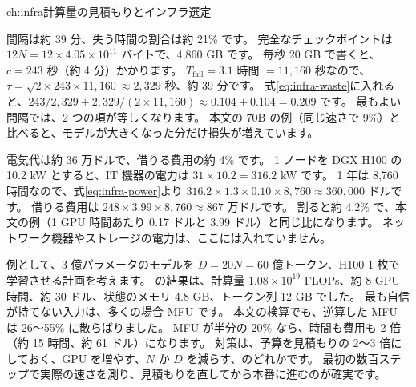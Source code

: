 \begin{answers}{ch:infra}{計算量の見積もりとインフラ選定}
\item 間隔は約 39 分、失う時間の割合は約 21\% です。
完全なチェックポイントは $12N=12\times4.05\times10^{11}$ バイトで、4,860 GB です。
毎秒 20 GB で書くと、$c=243$ 秒（約 4 分）かかります。
$T_{\mathrm{fail}}=3.1$ 時間 $=11{,}160$ 秒なので、$\tau=\sqrt{2\times243\times11{,}160}\approx2{,}329$ 秒、約 39 分です。
式\eqref{eq:infra-waste}に入れると、$243/2{,}329+2{,}329/(2\times11{,}160)\approx0.104+0.104=0.209$ です。
最もよい間隔では、2 つの項が等しくなります。
本文の 70B の例（同じ速さで 9\%）と比べると、モデルが大きくなった分だけ損失が増えています。
\item 電気代は約 36 万ドルで、借りる費用の約 4\% です。
1 ノードを DGX H100 の 10.2 kW とすると、IT 機器の電力は $31\times10.2=316.2$ kW です。
1 年は 8,760 時間なので、式\eqref{eq:infra-power}より $316.2\times1.3\times0.10\times8{,}760\approx360{,}000$ ドルです。
借りる費用は $248\times3.99\times8{,}760\approx867$ 万ドルです。
割ると約 4.2\% で、本文の例（1 GPU 時間あたり 0.17 ドルと 3.99 ドル）と同じ比になります。
ネットワーク機器やストレージの電力は、ここには入れていません。
\item 例として、3 億パラメータのモデルを $D=20N=60$ 億トークン、H100 1 枚で学習させる計画を考えます。
 の結果は、計算量 $1.08\times10^{19}$ FLOPs、約 8 GPU 時間、約 30 ドル、状態のメモリ 4.8 GB、トークン列 12 GB でした。
最も自信が持てない入力は、多くの場合 MFU です。
本文の検算でも、逆算した MFU は 26〜55\% に散らばりました。
MFU が半分の 20\% なら、時間も費用も 2 倍（約 15 時間、約 61 ドル）になります。
対策は、予算を見積もりの 2〜3 倍にしておく、GPU を増やす、$N$ か $D$ を減らす、のどれかです。
最初の数百ステップで実際の速さを測り、見積もりを直してから本番に進むのが確実です。
\end{answers}
